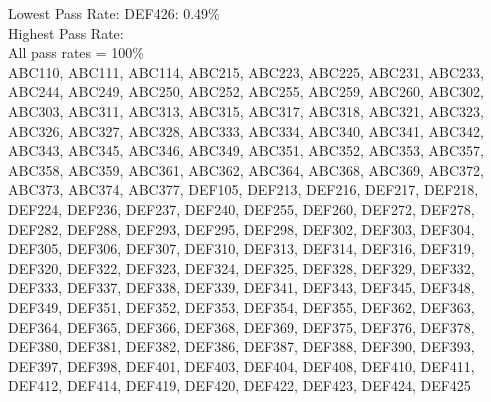 
Lowest Pass Rate:
DEF426: 0.49\%\\

Highest Pass Rate:\\
All pass rates = 100\%\\
ABC110, ABC111, ABC114, ABC215, ABC223, ABC225, ABC231, ABC233, ABC244, ABC249, ABC250, ABC252, ABC255, ABC259, ABC260, ABC302, ABC303, ABC311, ABC313, ABC315, ABC317, ABC318, ABC321, ABC323, ABC326, ABC327, ABC328, ABC333, ABC334, ABC340, ABC341, ABC342, ABC343, ABC345, ABC346, ABC349, ABC351, ABC352, ABC353, ABC357, ABC358, ABC359, ABC361, ABC362, ABC364, ABC368, ABC369, ABC372, ABC373, ABC374, ABC377, DEF105, DEF213, DEF216, DEF217, DEF218, DEF224, DEF236, DEF237, DEF240, DEF255, DEF260, DEF272, DEF278, DEF282, DEF288, DEF293, DEF295, DEF298, DEF302, DEF303, DEF304, DEF305, DEF306, DEF307, DEF310, DEF313, DEF314, DEF316, DEF319, DEF320, DEF322, DEF323, DEF324, DEF325, DEF328, DEF329, DEF332, DEF333, DEF337, DEF338, DEF339, DEF341, DEF343, DEF345, DEF348, DEF349, DEF351, DEF352, DEF353, DEF354, DEF355, DEF362, DEF363, DEF364, DEF365, DEF366, DEF368, DEF369, DEF375, DEF376, DEF378, DEF380, DEF381, DEF382, DEF386, DEF387, DEF388, DEF390, DEF393, DEF397, DEF398, DEF401, DEF403, DEF404, DEF408, DEF410, DEF411, DEF412, DEF414, DEF419, DEF420, DEF422, DEF423, DEF424, DEF425